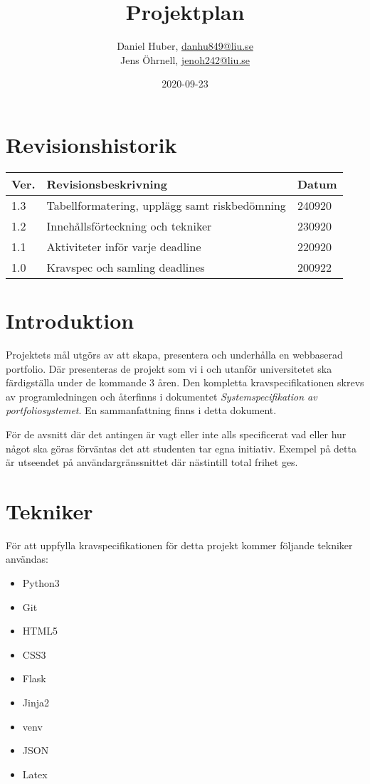 \documentclass{TDP003mall}
\author{Daniel Huber, \url{danhu849@liu.se}\\
	Jens Öhrnell, \url{jenoh242@liu.se}}
\title{Projektplan}
\date{2020-09-23}
\begin{document}
\projectpage

\tableofcontents
\newpage



\section{Revisionshistorik}
\begin{table}[!h]
\begin{tabularx}{\linewidth}{|X|X|X|}
\hline
Ver. & Revisionsbeskrivning & Datum \\\hline
1.3 & Tabellformatering, upplägg samt riskbedömning & 240920\\\hline
1.2 & Innehållsförteckning och tekniker & 230920\\\hline
1.1 & Aktiviteter inför varje deadline & 220920\\\hline
1.0 & Kravspec och samling deadlines & 200922 \\\hline
\end{tabularx}
\end{table}


\section{Introduktion}
Projektets mål utgörs av att skapa, presentera och underhålla en webbaserad portfolio. Där presenteras de projekt som vi i och utanför universitetet ska färdigställa under de kommande 3 åren. Den kompletta kravspecifikationen skrevs av programledningen och återfinns i dokumentet \textit{Systemspecifikation av portfoliosystemet}. En sammanfattning finns i detta dokument.

För de avsnitt där det antingen är vagt eller inte alls specificerat vad eller hur något ska göras förväntas det att studenten tar egna initiativ. Exempel på detta är utseendet på användargränssnittet där nästintill total frihet ges.

\section{Tekniker}
För att uppfylla kravspecifikationen för detta projekt kommer följande tekniker användas:
\begin{itemize}
\item Python3
\item Git
\item HTML5
\item CSS3
\item Flask
\item Jinja2
\item venv
\item JSON
\item Latex
\end{itemize}
\end{document}
